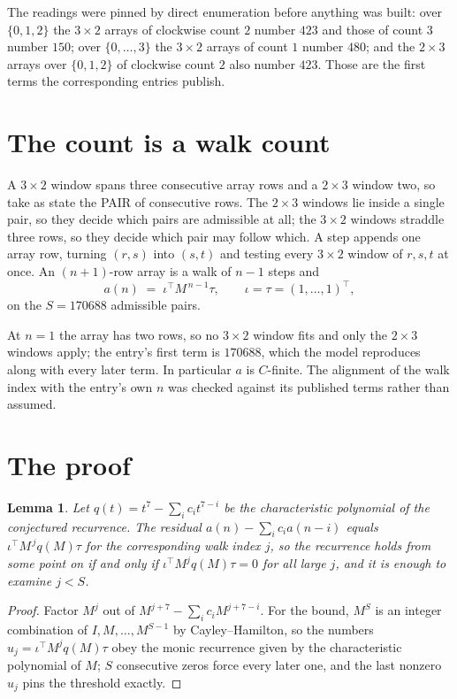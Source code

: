 \documentclass[11pt,a4paper]{article}
\theoremstyle{plain}
\newtheorem{lemma}[theorem]{Lemma}
\theoremstyle{definition}
\begin{document}
The readings were pinned by direct enumeration before anything was built: over
$\{0,1,2\}$ the $3\times2$ arrays of clockwise count $2$ number $423$ and those of count
$3$ number $150$; over $\{0,\dots,3\}$ the $3\times2$ arrays of count $1$ number $480$;
and the $2\times3$ arrays over $\{0,1,2\}$ of clockwise count $2$ also number $423$. Those
are the first terms the corresponding entries publish.

\section{The count is a walk count}

A $3\times2$ window spans three consecutive array rows and a $2\times3$
window two, so take as state the PAIR of consecutive rows. The $2\times3$ windows lie inside a
single pair, so they decide which pairs are admissible at all; the $3\times2$ windows straddle
three rows, so they decide which pair may follow which. A step appends one array row, turning
$(r,s)$ into $(s,t)$ and testing every $3\times2$ window of $r,s,t$ at once. An $(n+1)$-row
array is a walk of $n-1$ steps and
\[
a(n)\;=\;\iota^{\!\top}M^{\,n-1}\tau,\qquad\iota=\tau=(1,\dots,1)^{\!\top},
\]
on the $S=170688$ admissible pairs.

At $n=1$ the array has two rows, so no $3\times2$ window fits and only the
$2\times3$ windows apply; the entry's first term is
$170688$, which the model reproduces along with every later term.
In particular $a$ is $C$-finite. The alignment of the walk index with the entry's own $n$ was
checked against its published terms rather than assumed.

\section{The proof}

\begin{lemma}\label{lem:crit}
Let $q(t)=t^{7}-\sum_i c_it^{7-i}$ be the characteristic polynomial of the
conjectured recurrence. The residual $a(n)-\sum_ic_ia(n-i)$ equals
$\iota^{\!\top}M^{\,j}q(M)\tau$ for the corresponding walk index $j$, so the recurrence
holds from some point on if and only if $\iota^{\!\top}M^{j}q(M)\tau=0$ for all large $j$,
and it is enough to examine $j<S$.
\end{lemma}

\begin{proof}
Factor $M^{j}$ out of $M^{j+7}-\sum_ic_iM^{j+7-i}$. For the bound, $M^{S}$
is an integer combination of $I,M,\dots,M^{S-1}$ by Cayley--Hamilton, so the numbers
$u_j=\iota^{\!\top}M^{j}q(M)\tau$ obey the monic recurrence given by the characteristic
polynomial of $M$; $S$ consecutive zeros force every later one, and the last nonzero $u_j$
pins the threshold exactly.
\end{proof}
\end{document}
